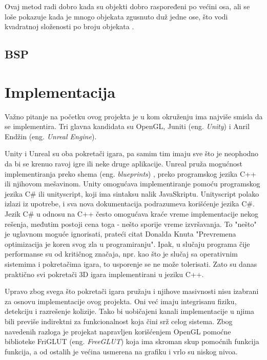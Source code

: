 \documentclass[12pt,oneside]{memoir}
\begin{document}
Ovaj metod radi dobro kada su objekti dobro raspoređeni po većini osa, ali se loše pokazuje kada je
mnogo objekata zgusnuto duž jedne ose, što vodi kvadratnoj složenosti po broju objekata \cite{glavna2}.

\section{BSP}
\label{subsec:bsp}

\chapter{Implementacija}
\label{sec:implementacija}

Važno pitanje na početku ovog projekta je u kom okruženju ima najviše smisla da se implementira.
Tri glavna kandidata su OpenGL, Juniti (eng. {\em Unity}) i Anril Endžin (eng. {\em Unreal Engine}).

Unity i Unreal su oba pokretači igara, pa samim tim imaju sve što je neophodno da 
bi se krenuo ravoj igre ili neke druge aplikacije.
Unreal pruža mogućnost implementiranja preko shema (eng. {\em blueprints})
, preko programskog jezika C++ ili njihovom mešavinom.
Unity omogućava implementiranje pomoću programskog jezika C\# ili unityscript,
koji ima sintaksu nalik JavaSkriptu. Unityscript polako izlazi iz upotrebe, i 
sva nova dokumentacija podrazumeva korišćenje jezika C\#.
Jezik C\# u odnosu na C++ često omogućava kraće vreme implementacije nekog rešenja,
međutim postoji cena toga - nešto sporije vreme izvršavanja.
To "nešto" je uglavnom moguće ignorisati, prateći citat Donalda Knuta 
"Prevremena optimizacija je koren svog zla u programiranju".
Ipak, u slučaju programa čije performanse su od kritičnog značaja, npr. kao što je 
slučaj sa operativnim sistemima i pokretačima igara, to usporenje se ne može tolerisati.
Zato su danas praktično svi pokretači 3D igara implementirani u jeziku C++.

Upravo zbog svega što pokretači igara pružaju i njihove masivnosti nisu izabrani
za osnovu implementacije ovog projekta. Oni već imaju integrisanu fiziku, detekciju 
i razrešenje kolizije. Tako bi uobičajeni kanali implementacije u njima 
bili previše indirektni za funkcionalnost koja čini srž celog sistema.
Zbog navedenih razloga je projekat napravljen korišćenjem OpenGL pomoćne 
biblioteke FriGLUT (eng. {\em FreeGLUT}) koja ima skroman skup pomoćnih funkcija
funkcija, a od ostalih je većina usmerena na grafiku i vrlo su niskog nivoa.
\end{document}
